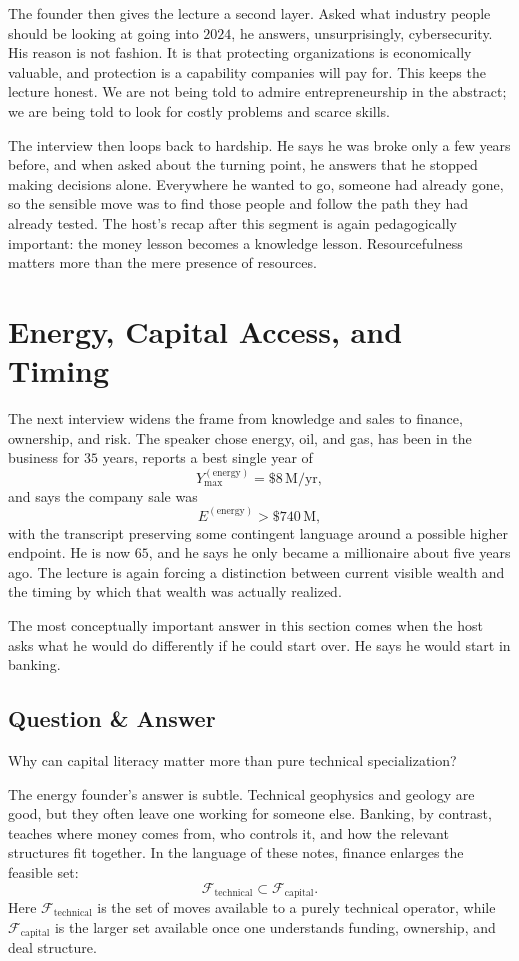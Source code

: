 The founder then gives the lecture a second layer. Asked what industry people should be looking at going into \(2024\), he answers, unsurprisingly, cybersecurity. His reason is not fashion. It is that protecting organizations is economically valuable, and protection is a capability companies will pay for. This keeps the lecture honest. We are not being told to admire entrepreneurship in the abstract; we are being told to look for costly problems and scarce skills.

The interview then loops back to hardship. He says he was broke only a few years before, and when asked about the turning point, he answers that he stopped making decisions alone. Everywhere he wanted to go, someone had already gone, so the sensible move was to find those people and follow the path they had already tested. The host's recap after this segment is again pedagogically important: the money lesson becomes a knowledge lesson. Resourcefulness matters more than the mere presence of resources.

\section{Energy, Capital Access, and Timing}

The next interview widens the frame from knowledge and sales to finance, ownership, and risk. The speaker chose energy, oil, and gas, has been in the business for \(35\) years, reports a best single year of
\[
Y_{\max}^{(\mathrm{energy})}=\$8\,\mathrm{M/yr},
\]
and says the company sale was
\[
E^{(\mathrm{energy})}>\$740\,\mathrm{M},
\]
with the transcript preserving some contingent language around a possible higher endpoint. He is now \(65\), and he says he only became a millionaire about five years ago. The lecture is again forcing a distinction between current visible wealth and the timing by which that wealth was actually realized.

The most conceptually important answer in this section comes when the host asks what he would do differently if he could start over. He says he would start in banking.

\subsection{Question \& Answer}

Why can capital literacy matter more than pure technical specialization?

The energy founder's answer is subtle. Technical geophysics and geology are good, but they often leave one working for someone else. Banking, by contrast, teaches where money comes from, who controls it, and how the relevant structures fit together. In the language of these notes, finance enlarges the feasible set:
\begin{equation}
\mathcal{F}_{\text{technical}} \subset \mathcal{F}_{\text{capital}}.
\end{equation}
Here \(\mathcal{F}_{\text{technical}}\) is the set of moves available to a purely technical operator, while \(\mathcal{F}_{\text{capital}}\) is the larger set available once one understands funding, ownership, and deal structure.

